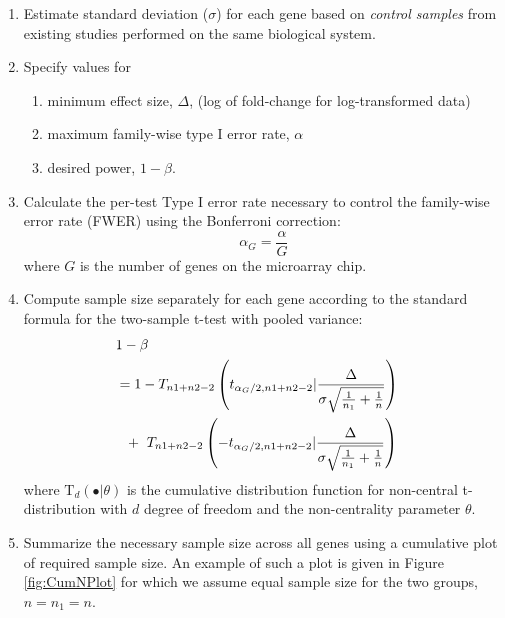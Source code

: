 \documentclass{bioinfo}
\begin{document}
\begin{enumerate}
\item{Estimate standard deviation ($\sigma$) for each gene based on
    \emph{control samples} from existing studies performed on the
    same biological system.}

\item{Specify values for
    \begin{enumerate}
    \item minimum effect size, $\Delta$, (log of fold-change for log-transformed data)
    \item maximum family-wise type I error rate, $\alpha$
    \item desired power, $1 - \beta$.
    \end{enumerate}
  }

\item{Calculate the per-test Type I error rate necessary to control
    the family-wise error rate (FWER) using the Bonferroni correction:}
\begin{equation}
  \alpha_G = \frac{\alpha}{G}
\end{equation}
%
where $G$ is the number of genes on the microarray chip.

\item{Compute sample size separately for each gene according to the
    standard formula for the two-sample t-test with pooled variance:}
  \begin{eqnarray}
    \lefteqn{1-\beta} \nonumber \\
    &= 1-T_{n1+n2-2} \left( t_{\alpha_G/2,n1+n2-2} | \frac{\Delta}{\sigma \sqrt{\frac{1}{n_1} + \frac{1}{n}}}\right) \nonumber \\
    &  ~~+~T_{n1+n2-2} \left( -t_{\alpha_G/2,n1+n2-2} | \frac{\Delta}{\sigma \sqrt{\frac{1}{n_1} + \frac{1}{n}}}\right)
    \label{eq:formula}
  \end{eqnarray}
  where $\mathrm{T}_{d}(\bullet|\theta)$ is the cumulative
  distribution function for non-central t-distribution with $d$ degree
  of freedom and the non-centrality parameter $\theta$.

\item{Summarize the necessary sample size across all genes using a
      cumulative plot of required sample size. An example of such a
      plot is given in Figure \ref{fig:CumNPlot} for which we assume equal sample size for the two groups, $n = n_1 = n$.}

\end{enumerate}
\end{document}
